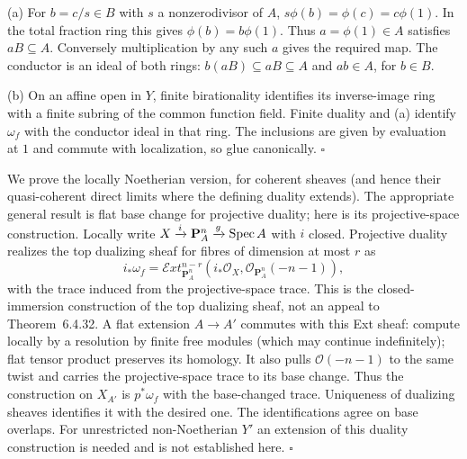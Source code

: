 \documentclass[11pt]{article}
\let\chapterexercise\exercise
\renewcommand{\exercise}[2]{\Needspace{8\baselineskip}\chapterexercise{#1}{#2}}
\begin{document}
\pf
(a) For $b=c/s\in B$ with $s$ a nonzerodivisor of $A$, $s\phi(b)=\phi(c)=c\phi(1)$. In the total fraction ring this gives $\phi(b)=b\phi(1)$. Thus $a=\phi(1)\in A$ satisfies $aB\subseteq A$. Conversely multiplication by any such $a$ gives the required map. The conductor is an ideal of both rings: $b(aB)\subseteq aB\subseteq A$ and $ab\in A$, for $b\in B$.

(b) On an affine open in $Y$, finite birationality identifies its inverse-image ring with a finite subring of the common function field. Finite duality and (a) identify $\omega_f$ with the conductor ideal in that ring. The inclusions are given by evaluation at $1$ and commute with localization, so glue canonically. \hfill$\square$

\pf
We prove the locally Noetherian version, for coherent sheaves (and hence their quasi-coherent direct limits where the defining duality extends). The appropriate general result is flat base change for projective duality; here is its projective-space construction. Locally write $X\xrightarrow{i}\mathbf P^n_A\xrightarrow{g}\operatorname{Spec} A$ with $i$ closed. Projective duality realizes the top dualizing sheaf for fibres of dimension at most $r$ as
\[ i_*\omega_f=\mathcal E xt^{n-r}_{\mathbf P^n_A}(i_*\mathcal O_X,\mathcal O_{\mathbf P^n_A}(-n-1)), \]
with the trace induced from the projective-space trace. This is the closed-immersion construction of the top dualizing sheaf, not an appeal to Theorem~6.4.32. A flat extension $A\to A'$ commutes with this Ext sheaf: compute locally by a resolution by finite free modules (which may continue indefinitely); flat tensor product preserves its homology. It also pulls $\mathcal O(-n-1)$ to the same twist and carries the projective-space trace to its base change. Thus the construction on $X_{A'}$ is $p^*\omega_f$ with the base-changed trace. Uniqueness of dualizing sheaves identifies it with the desired one. The identifications agree on base overlaps. For unrestricted non-Noetherian $Y'$ an extension of this duality construction is needed and is not established here. \hfill$\square$
\end{document}

